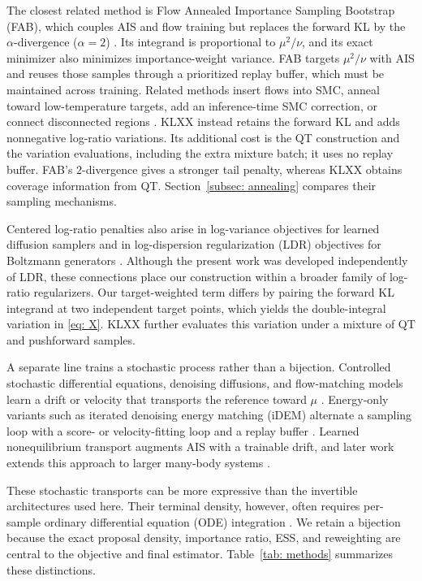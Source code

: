 \documentclass{article}
\begin{document}
The closest related method is Flow Annealed Importance Sampling Bootstrap (FAB), which couples AIS and flow training but replaces the forward KL by the $\alpha$-divergence ($\alpha=2$) \citep{midgley2022flow}. Its integrand is proportional to $\mu^2/\nu$, and its exact minimizer also minimizes importance-weight variance. FAB targets $\mu^2/\nu$ with AIS and reuses those samples through a prioritized replay buffer, which must be maintained across training. Related methods insert flows into SMC, anneal toward low-temperature targets, add an inference-time SMC correction, or connect disconnected regions \citep{arbel2021annealed,matthews2022craft,schopmans2025temperature,tan2025sequential,vonklitzing2026constrained}. KLXX instead retains the forward KL and adds nonnegative log-ratio variations. Its additional cost is the QT construction and the variation evaluations, including the extra mixture batch; it uses no replay buffer. FAB's $2$-divergence gives a stronger tail penalty, whereas KLXX obtains coverage information from QT. Section~\ref{subsec: annealing} compares their sampling mechanisms.

Centered log-ratio penalties also arise in log-variance objectives for learned diffusion samplers \citep{richter2024improved} and in log-dispersion regularization (LDR) objectives for Boltzmann generators \citep{schopmans2026ldr}. Although the present work was developed independently of LDR, these connections place our construction within a broader family of log-ratio regularizers. Our target-weighted term differs by pairing the forward KL integrand at two independent target points, which yields the double-integral variation in \eqref{eq: X}. KLXX further evaluates this variation under a mixture of QT and pushforward samples.

A separate line trains a stochastic process rather than a bijection. Controlled stochastic differential equations, denoising diffusions, and flow-matching models learn a drift or velocity that transports the reference toward $\mu$ \citep{zhang2022path,vargas2023denoising,berner2024optimal,nusken2021solving,richter2024improved}. Energy-only variants such as iterated denoising energy matching (iDEM) alternate a sampling loop with a score- or velocity-fitting loop and a replay buffer \citep{akhound2024iterated,woo2024iefm}. Learned nonequilibrium transport augments AIS with a trainable drift, and later work extends this approach to larger many-body systems \citep{albergo2024nets,havens2025adjoint,akhoundsadegh2025progressive}.

These stochastic transports can be more expressive than the invertible architectures used here. Their terminal density, however, often requires per-sample ordinary differential equation (ODE) integration \citep{he2025notrick}. We retain a bijection because the exact proposal density, importance ratio, ESS, and reweighting are central to the objective and final estimator. Table~\ref{tab: methods} summarizes these distinctions.
\end{document}

